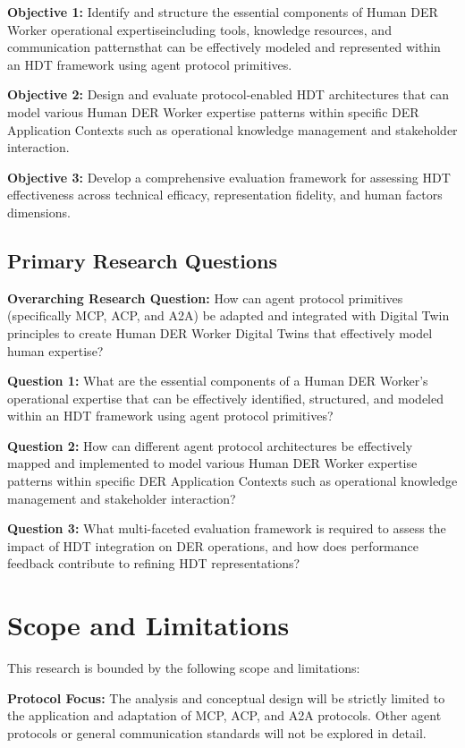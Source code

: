 \documentclass[12pt,a4paper]{article}
\newcommand{\emdash}{\textemdash}
\begin{document}
\textbf{Objective 1:} Identify and structure the essential components of Human DER Worker operational expertise\emdash{}including tools, knowledge resources, and communication patterns\emdash{}that can be effectively modeled and represented within an HDT framework using agent protocol primitives.

\textbf{Objective 2:} Design and evaluate protocol-enabled HDT architectures that can model various Human DER Worker expertise patterns within specific DER Application Contexts such as operational knowledge management and stakeholder interaction.

\textbf{Objective 3:} Develop a comprehensive evaluation framework for assessing HDT effectiveness across technical efficacy, representation fidelity, and human factors dimensions.

\subsection{Primary Research Questions}

\textbf{Overarching Research Question:} How can agent protocol primitives (specifically MCP, ACP, and A2A) be adapted and integrated with Digital Twin principles to create Human DER Worker Digital Twins that effectively model human expertise?

\textbf{Question 1:} What are the essential components of a Human DER Worker's operational expertise that can be effectively identified, structured, and modeled within an HDT framework using agent protocol primitives?

\textbf{Question 2:} How can different agent protocol architectures be effectively mapped and implemented to model various Human DER Worker expertise patterns within specific DER Application Contexts such as operational knowledge management and stakeholder interaction?

\textbf{Question 3:} What multi-faceted evaluation framework is required to assess the impact of HDT integration on DER operations, and how does performance feedback contribute to refining HDT representations?

\section{Scope and Limitations}
\label{sec:scope}

This research is bounded by the following scope and limitations:

\textbf{Protocol Focus:} The analysis and conceptual design will be strictly limited to the application and adaptation of MCP, ACP, and A2A protocols. Other agent protocols or general communication standards will not be explored in detail.
\end{document}
